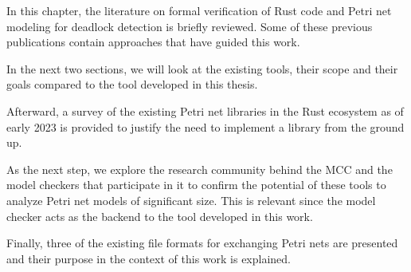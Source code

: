 In this chapter, the literature on formal verification of Rust code
and Petri net modeling for deadlock detection is briefly reviewed.
Some of these previous publications contain approaches
that have guided this work.

In the next two sections, we will look at the existing tools,
their scope and their goals compared to the tool developed in this thesis.

Afterward, a survey of the existing Petri net libraries in the Rust ecosystem
as of early 2023 is provided to justify the need to implement a library
from the ground up.

As the next step, we explore the research community behind the \acrfull{MCC}
and the model checkers that participate in it
to confirm the potential of these tools
to analyze Petri net models of significant size.
This is relevant since the model checker acts
as the backend to the tool developed in this work.

Finally, three of the existing file formats for exchanging Petri nets are presented
and their purpose in the context of this work is explained.